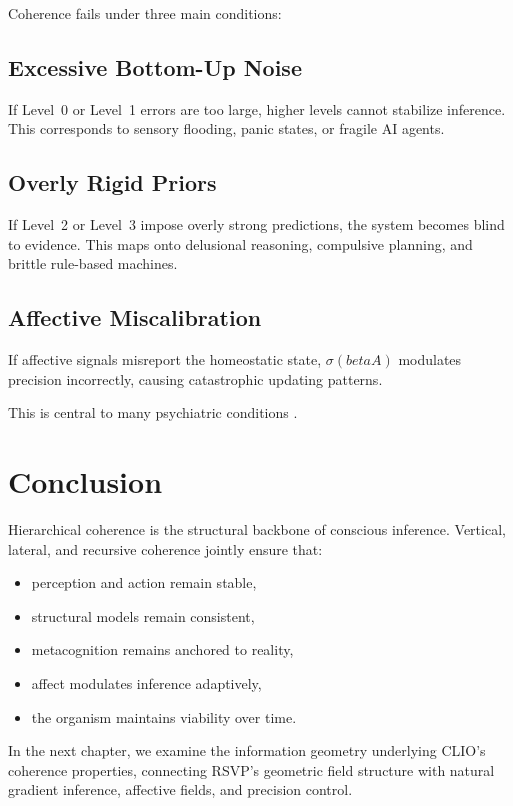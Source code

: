 \documentclass[12pt,oneside]{book}
\theoremstyle{plain}
\theoremstyle{definition}
\let\citep\parencite
\def\beta{beta}%
\begin{document}
Coherence fails under three main conditions:

\subsection{Excessive Bottom-Up Noise}

If Level~0 or Level~1 errors are too large, higher levels cannot stabilize
inference.
This corresponds to sensory flooding, panic states, or fragile AI agents.

\subsection{Overly Rigid Priors}

If Level~2 or Level~3 impose overly strong predictions, the system becomes
blind to evidence.
This maps onto delusional reasoning, compulsive planning, and brittle rule-based
machines.

\subsection{Affective Miscalibration}

If affective signals misreport the homeostatic state,
$\sigma(\beta A)$ modulates precision incorrectly, causing catastrophic updating
patterns.

This is central to many psychiatric conditions
\citep{solms2021hidden,montague2012computational}.

\section{Conclusion}

Hierarchical coherence is the structural backbone of conscious inference.
Vertical, lateral, and recursive coherence jointly ensure that:

\begin{itemize}
    \item perception and action remain stable,
    \item structural models remain consistent,
    \item metacognition remains anchored to reality,
    \item affect modulates inference adaptively,
    \item the organism maintains viability over time.
\end{itemize}

In the next chapter, we examine the information geometry underlying CLIO’s
coherence properties, connecting RSVP’s geometric field structure with natural
gradient inference, affective fields, and precision control.
\end{document}
